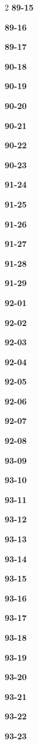 \documentclass[10pt,a4paper]{article}
\begin{document}
\begin{multicols}{2}
\noindent\textbf{89-15}\ \par
\noindent\textbf{89-16}\ \par
\noindent\textbf{89-17}\ \par
\noindent\textbf{90-18}\ \par
\noindent\textbf{90-19}\ \par
\noindent\textbf{90-20}\ \par
\noindent\textbf{90-21}\ \par
\noindent\textbf{90-22}\ \par
\noindent\textbf{90-23}\ \par
\noindent\textbf{91-24}\ \par
\noindent\textbf{91-25}\ \par
\noindent\textbf{91-26}\ \par
\noindent\textbf{91-27}\ \par
\noindent\textbf{91-28}\ \par
\noindent\textbf{91-29}\ \par
\noindent\textbf{92-01}\ \par
\noindent\textbf{92-02}\ \par
\noindent\textbf{92-03}\ \par
\noindent\textbf{92-04}\ \par
\noindent\textbf{92-05}\ \par
\noindent\textbf{92-06}\ \par
\noindent\textbf{92-07}\ \par
\noindent\textbf{92-08}\ \par
\noindent\textbf{93-09}\ \par
\noindent\textbf{93-10}\ \par
\noindent\textbf{93-11}\ \par
\noindent\textbf{93-12}\ \par
\noindent\textbf{93-13}\ \par
\noindent\textbf{93-14}\ \par
\noindent\textbf{93-15}\ \par
\noindent\textbf{93-16}\ \par
\noindent\textbf{93-17}\ \par
\noindent\textbf{93-18}\ \par
\noindent\textbf{93-19}\ \par
\noindent\textbf{93-20}\ \par
\noindent\textbf{93-21}\ \par
\noindent\textbf{93-22}\ \par
\noindent\textbf{93-23}\ \par

\end{multicols}
\end{document}
